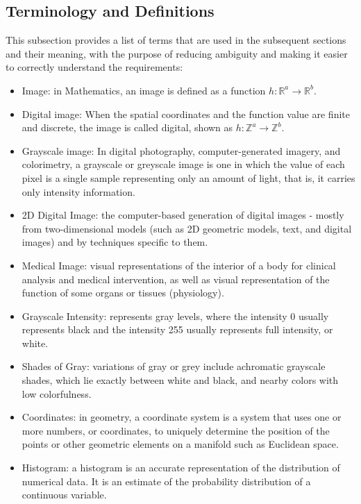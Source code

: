 \documentclass[12pt]{article}
\begin{document}
\subsection{Terminology and  Definitions}

This subsection provides a list of terms that are used in the subsequent
sections and their meaning, with the purpose of reducing ambiguity and making it
easier to correctly understand the requirements:

\begin{itemize}

\item Image: in Mathematics, an image is defined as a function $h : \mathbb{R}^{a} \rightarrow \mathbb{R}^{b}$.
\item Digital image: When the spatial coordinates and the function value are finite and discrete, the image is called digital, shown as $h : \mathbb{Z}^{a} \rightarrow \mathbb{Z}^{b}$.
\item Grayscale image: In digital photography, computer-generated imagery, and colorimetry, a grayscale or greyscale image is one in which the value of each pixel is a single sample representing only an amount of light, that is, it carries only intensity information.
\item 2D Digital Image: the computer-based generation of digital images - mostly from two-dimensional models (such as 2D geometric models, text, and digital images) and by techniques specific to them.
\item Medical Image: visual representations of the interior of a body for clinical analysis and medical intervention, as well as visual representation of the function of some organs or tissues (physiology).
\item Grayscale Intensity: represents gray levels, where the intensity 0 usually represents black and the intensity 255 usually represents full intensity, or white.
\item Shades of Gray: variations of gray or grey include achromatic grayscale shades, which lie exactly between white and black, and nearby colors with low colorfulness.
\item Coordinates: in geometry, a coordinate system is a system that uses one or more numbers, or coordinates, to uniquely determine the position of the points or other geometric elements on a manifold such as Euclidean space.
\item Histogram: a histogram is an accurate representation of the distribution of numerical data. It is an estimate of the probability distribution of a continuous variable.

\end{itemize}
\end{document}
